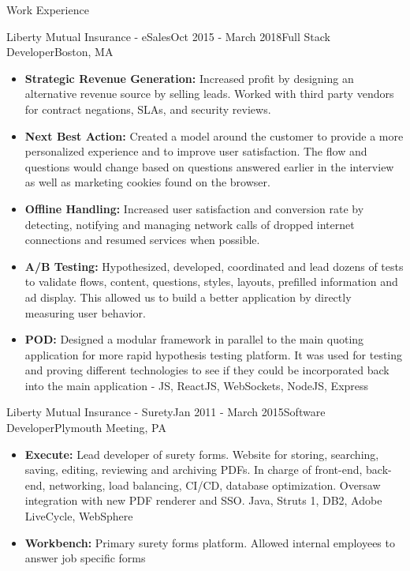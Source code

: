 \documentclass{resume} %
\begin{document}
\begin{rSection}{Work Experience}
\begin{rSubsection}{Liberty Mutual Insurance - eSales}{Oct 2015 - March 2018}{Full Stack Developer}{Boston, MA}
\begin{itemize}
    \item \textbf{Strategic Revenue Generation:} Increased profit by designing an alternative revenue source by selling leads. Worked with third party vendors for contract negations, SLAs, and security reviews.
    \item \textbf{Next Best Action:} Created a model around the customer to provide a more personalized experience and to improve user satisfaction. The flow and questions would change based on questions answered earlier in the interview as well as marketing cookies found on the browser.
    \item \textbf{Offline Handling:} Increased user satisfaction and conversion rate by detecting, notifying and managing network calls of dropped internet connections and resumed services when possible.
    \item \textbf{A/B Testing:} Hypothesized, developed, coordinated and lead dozens of tests to validate flows, content, questions, styles, layouts, prefilled information and ad display. This allowed us to build a better application by directly measuring user behavior.
    \item \textbf{POD:} Designed a modular framework in parallel to the main quoting application for more rapid hypothesis testing platform. It was used for testing and proving different technologies to see if they could be incorporated back into the main application - JS, ReactJS, WebSockets, NodeJS, Express
\end{itemize}
\end{rSubsection}

\begin{rSubsection}{Liberty Mutual Insurance - Surety}{Jan 2011 - March 2015}{Software Developer}{Plymouth Meeting, PA}
\begin{itemize}
    \item \textbf{Execute:} Lead developer of surety forms. Website for storing, searching, saving, editing, reviewing and archiving PDFs. In charge of front-end, back-end, networking, load balancing, CI/CD, database optimization. Oversaw integration with new PDF renderer and SSO. Java, Struts 1, DB2, Adobe LiveCycle, WebSphere
    \item \textbf{Workbench:} Primary surety forms platform. Allowed internal employees to answer job specific forms
\end{itemize}
\end{rSubsection}

\end{rSection}
\end{document}
